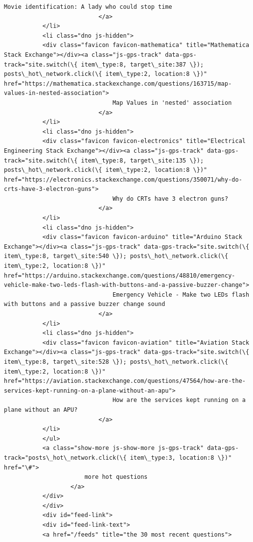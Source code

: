 \documentclass[11pt]{article}
\begin{document}
\begin{Verbatim}[commandchars=\\\{\}]
                               Movie identification: A lady who could stop time
                           </a>
           </li>
           <li class="dno js-hidden">
           <div class="favicon favicon-mathematica" title="Mathematica Stack Exchange"></div><a class="js-gps-track" data-gps-track="site.switch(\{ item\_type:8, target\_site:387 \}); posts\_hot\_network.click(\{ item\_type:2, location:8 \})" href="https://mathematica.stackexchange.com/questions/163715/map-values-in-nested-association">
                               Map Values in 'nested' association
                           </a>
           </li>
           <li class="dno js-hidden">
           <div class="favicon favicon-electronics" title="Electrical Engineering Stack Exchange"></div><a class="js-gps-track" data-gps-track="site.switch(\{ item\_type:8, target\_site:135 \}); posts\_hot\_network.click(\{ item\_type:2, location:8 \})" href="https://electronics.stackexchange.com/questions/350071/why-do-crts-have-3-electron-guns">
                               Why do CRTs have 3 electron guns?
                           </a>
           </li>
           <li class="dno js-hidden">
           <div class="favicon favicon-arduino" title="Arduino Stack Exchange"></div><a class="js-gps-track" data-gps-track="site.switch(\{ item\_type:8, target\_site:540 \}); posts\_hot\_network.click(\{ item\_type:2, location:8 \})" href="https://arduino.stackexchange.com/questions/48810/emergency-vehicle-make-two-leds-flash-with-buttons-and-a-passive-buzzer-change">
                               Emergency Vehicle - Make two LEDs flash with buttons and a passive buzzer change sound
                           </a>
           </li>
           <li class="dno js-hidden">
           <div class="favicon favicon-aviation" title="Aviation Stack Exchange"></div><a class="js-gps-track" data-gps-track="site.switch(\{ item\_type:8, target\_site:528 \}); posts\_hot\_network.click(\{ item\_type:2, location:8 \})" href="https://aviation.stackexchange.com/questions/47564/how-are-the-services-kept-running-on-a-plane-without-an-apu">
                               How are the services kept running on a plane without an APU?
                           </a>
           </li>
           </ul>
           <a class="show-more js-show-more js-gps-track" data-gps-track="posts\_hot\_network.click(\{ item\_type:3, location:8 \})" href="\#">
                       more hot questions
                   </a>
           </div>
           </div>
           <div id="feed-link">
           <div id="feed-link-text">
           <a href="/feeds" title="the 30 most recent questions">

\end{Verbatim}
\end{document}
